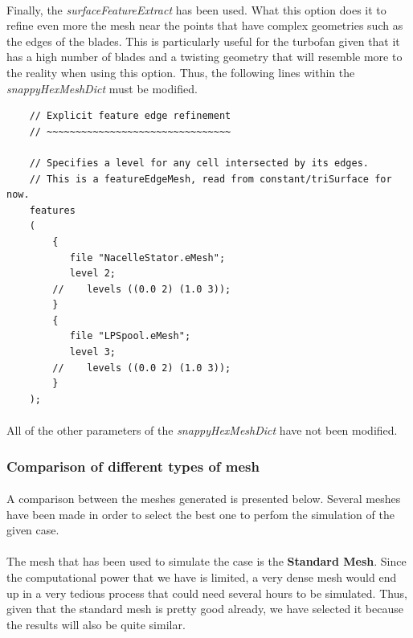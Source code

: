 \paragraph{}Finally, the \textit{surfaceFeatureExtract} has been used.  What this option does it to refine even more the mesh near the points that have complex geometries such as the edges of the blades. This is particularly useful for the turbofan given that it has a high number of blades and a twisting geometry that will resemble more to the reality when using this option. Thus, the following lines within the \textit{snappyHexMeshDict} must be modified.

\begin{footnotesize}
\begin{verbatim}
    // Explicit feature edge refinement
    // ~~~~~~~~~~~~~~~~~~~~~~~~~~~~~~~~

    // Specifies a level for any cell intersected by its edges.
    // This is a featureEdgeMesh, read from constant/triSurface for now.
    features
    (
        {
           file "NacelleStator.eMesh";
           level 2;
        //    levels ((0.0 2) (1.0 3));
        }
        {
           file "LPSpool.eMesh";
           level 3;
        //    levels ((0.0 2) (1.0 3));
        }
    );
\end{verbatim}
\end{footnotesize}

\paragraph{}All of the other parameters of the \textit{snappyHexMeshDict} have not been modified. 

\subsubsection{Comparison of different types of mesh}


\paragraph{}A comparison between the meshes generated is presented below. Several meshes have been made in order to select the best one to perfom the simulation of the given case.

\paragraph{}The mesh that has been used to simulate the case is the \textbf{Standard Mesh}. Since the computational power that we have is limited, a very dense mesh would end up in a very tedious process that could need several hours to be simulated. Thus, given that the standard mesh is pretty good already, we have selected it because the results will also be quite similar.


